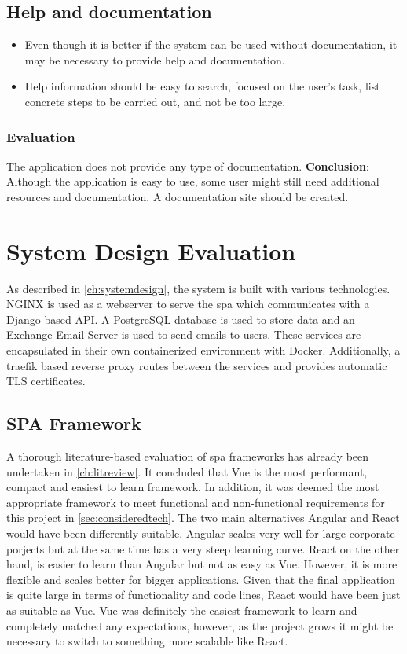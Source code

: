 \subsection{Help and documentation}

\begin{itemize}
    \item Even though it is better if the system can be used without documentation, it may be necessary to provide help and documentation. 
    \item Help information should be easy to search, focused on the user's task, list concrete steps to be carried out, and not be too large.
\end{itemize}

\subsubsection{Evaluation}
The application does not provide any type of documentation. \textbf{Conclusion}: Although the application is easy to use, some user might still need additional resources and documentation. A documentation site should be created.

\section{System Design Evaluation}
As described in \autoref{ch:systemdesign}, the system is built with various technologies. NGINX is used as a webserver to serve the \acrshort{spa} which communicates with a Django-based API. A PostgreSQL database is used to store data and an Exchange Email Server is used to send emails to users. These services are encapsulated in their own containerized environment with Docker. Additionally, a traefik based reverse proxy routes between the services and provides automatic TLS certificates.

\subsection{SPA Framework}
A thorough literature-based evaluation of \acrshort{spa} frameworks has already been undertaken in \autoref{ch:litreview}. It concluded that Vue is the most performant, compact and easiest to learn framework. In addition, it was deemed the most appropriate framework to meet functional and non-functional requirements for this project in \autoref{sec:consideredtech}. The two main alternatives Angular and React would have been differently suitable. Angular scales very well for large corporate porjects but at the same time has a very steep learning curve. React on the other hand, is easier to learn than Angular but not as easy as Vue. However, it is more flexible and scales better for bigger applications. Given that the final application is quite large in terms of functionality and code lines, React would have been just as suitable as Vue. Vue was definitely the easiest framework to learn and completely matched any expectations, however, as the project grows it might be necessary to switch to something more scalable like React. 

